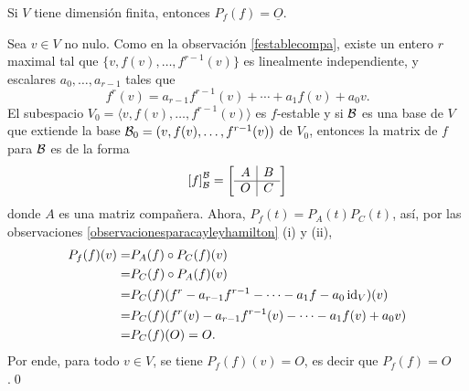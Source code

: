 \begin{teo}\label{cayleyhamilton}
  Si $V$ tiene dimensi\'on finita, entonces $P_f(f)=\underline{O}$.
\end{teo}

\dem Sea $v\in V$ no nulo. Como en la observación \ref{festablecompa}, existe un entero $r$ maximal tal que $\{v,f(v),\ldots,f^{r-1}(v)\}$ es linealmente independiente, y escalares $a_0,\ldots,a_{r-1}$ tales que
$$f^r(v)=a_{r-1}f^{r-1}(v)+\cdots+a_{1}f(v)+a_0v.$$
El subespacio $V_0=\langle v,f(v),\ldots,f^{r-1}(v)\rangle$ es $f$-estable y si $\mathcal{B}$ es una base de $V$ que extiende la base $\mathcal{B}_0=(v,f(v),\ldots,f^{r-1}(v))$ de $V_0$, entonces la matrix de $f$ para $\mathcal{B}$ es de la forma
$$
  \left[f\right]_{\mathcal{B}}^{\mathcal{B}}=\left[\begin{array}{c|c}
    A & B\\
    \hline
    O & C
  \end{array}\right]
$$
donde $A$ es una matriz compañera. Ahora, $P_f(t)=P_A(t)P_C(t)$, así, por las observaciones \ref{observacionesparacayleyhamilton} (i) y (ii),
\begin{align*}
  P_f(f)(v) = & P_A(f)\circ P_C(f)(v)\\
   = & P_C(f)\circ P_A(f)(v)\\
   = & P_C(f)(f^r-a_{r-1}f^{r-1}-\cdots-a_1f-a_0\operatorname{id}_V)(v)\\
   = & P_C(f)(f^r(v)-a_{r-1}f^{r-1}(v)-\cdots-a_{1}f(v)+a_0v)\\
   = & P_C(f)(O)=O.
\end{align*}
Por ende, para todo $v\in V$, se tiene $P_f(f)(v)=O$, es decir que $P_f(f)=O$.\qed

